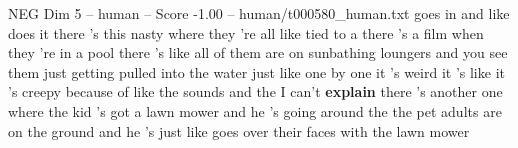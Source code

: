 \begin{textsample}{NEG Dim 5 – human – Score -1.00 – human/t000580\_human.txt}  \label{ex:f5_neg_032}
goes in and like does it there 's this nasty where they 're all like tied to a there 's a film when they 're in a pool there 's like all of them are on sunbathing loungers and you see them just getting pulled into the water just like one by one it 's weird it 's like it 's creepy because of like the sounds and the I can't \textbf{explain} there 's another one where the kid 's got a lawn mower and he 's going around the the pet adults are on the ground and he 's just like goes over their faces with the lawn mower

\end{textsample}
